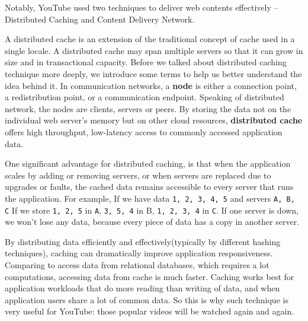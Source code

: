 
Notably, YouTube used two techniques to deliver web contents effectively -- Distributed Caching and Content Delivery Network.

A distributed cache is an extension of the traditional concept of cache used in a single locale. A distributed cache may span multiple servers so that it can grow in size and in transactional capacity. Before we talked about distributed caching technique more deeply, we introduce some terms to help us better understand the idea behind it. In communication networks, a \textbf{node} is either a connection point, a redistribution point, or a communication endpoint. Speaking of distributed network, the nodes are clients, servers or peers. By storing the data not on the individual web server's memory but on other cloud resources, \textbf{distributed cache} offers high throughput, low-latency access to commonly accessed application data.

One significant advantage for distributed caching, is that when the application scales by adding or removing servers, or when servers are replaced due to upgrades or faults, the cached data remains accessible to every server that runs the application. For example, If we have data \texttt{1, 2, 3, 4, 5} and servers \texttt{A, B, C} If we store \texttt{1, 2, 5} in \texttt{A}, \texttt{3, 5, 4} in B, \texttt{1, 2, 3, 4} in \texttt{C}. If one server is down, we won't lose any data, because every piece of data has a copy in another server.


By distributing data efficiently and effectively(typically by different hashing techniques), caching can dramatically improve application responsiveness. Comparing to access data from relational databases, which requires a lot computations, accessing data from cache is much faster. Caching works best for application workloads that do more reading than writing of data, and when application users share a lot of common data. So this is why such technique is very useful for YouTube: those popular videos will be watched again and again.

